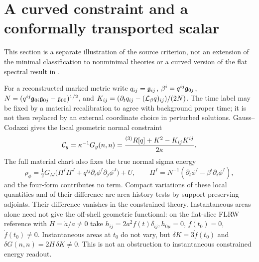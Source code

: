 \section{A curved constraint and a conformally transported scalar}\label{sec:curved}
This section is a separate illustration of the source criterion, not an extension of the minimal classification to nonminimal theories or a curved version of the flat spectral result in \cite{P45}.

For a reconstructed marked metric write \(q_{ij}=\mathfrak g_{ij}\), \(\beta^i=q^{ij}\mathfrak g_{0j}\), \(N=(q^{ij}\mathfrak g_{0i}\mathfrak g_{0j}-\mathfrak g_{00})^{1/2}\), and \(K_{ij}=(\partial_tq_{ij}-(\mathcal L_\beta q)_{ij})/(2N)\). The time label may be fixed by a material recalibration to agree with background proper time; it is not then replaced by an external coordinate choice in perturbed solutions. Gauss--Codazzi gives the local geometric normal constraint
\begin{equation}\label{eq:hc}
 {\cal C}_g=\kappa^{-1}G_g(n,n)
   =\frac{{}^{(3)}R[q]+K^2-K_{ij}K^{ij}}{2\kappa}.
\end{equation}
The full material chart also fixes the true normal sigma energy
\[
 \rho_\phi=\tfrac12G_{IJ}\bigl(\Pi^I\Pi^J+q^{ij}\partial_i\phi^I\partial_j\phi^J\bigr)
                 +U,\qquad
 \Pi^I=N^{-1}(\partial_t\phi^I-\beta^i\partial_i\phi^I),
\]
and the four-form contributes no term. Compact variations of these local quantities and of their difference are area-history tests by support-preserving adjoints. Their difference vanishes in the constrained theory. Instantaneous areas alone need not give the off-shell geometric functional: on the flat-slice FLRW reference with \(H=\dot a/a\ne0\) take \(h_{ij}=2a^2f(t)\delta_{ij},h_{0\mu}=0\), \(f(t_0)=0\), \(\dot f(t_0)\ne0\). Instantaneous areas at \(t_0\) do not vary, but \(\delta K=3\dot f(t_0)\) and \(\delta G(n,n)=2H\,\delta K\ne0\). This is not an obstruction to instantaneous constrained energy readout.

